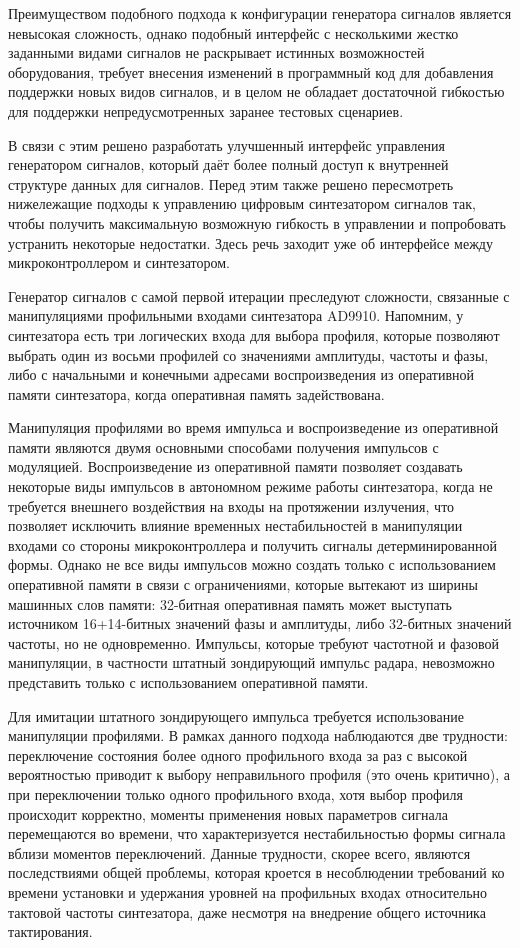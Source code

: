 \documentclass{report}
\begin{document}
Преимуществом подобного подхода к конфигурации генератора сигналов является невысокая сложность, однако подобный интерфейс с несколькими жестко заданными видами сигналов не раскрывает истинных возможностей оборудования, требует внесения изменений в программный код для добавления поддержки новых видов сигналов, и в целом не обладает достаточной гибкостью для поддержки непредусмотренных заранее тестовых сценариев.

В связи с этим решено разработать улучшенный интерфейс управления генератором сигналов, который даёт более полный доступ к внутренней структуре данных для сигналов. Перед этим также решено пересмотреть нижележащие подходы к управлению цифровым синтезатором сигналов так, чтобы получить максимальную возможную гибкость в управлении и попробовать устранить некоторые недостатки. Здесь речь заходит уже об интерфейсе между микроконтроллером и синтезатором.

Генератор сигналов с самой первой итерации преследуют сложности, связанные с манипуляциями профильными входами синтезатора AD9910. Напомним, у синтезатора есть три логических входа для выбора профиля, которые позволяют выбрать один из восьми профилей со значениями амплитуды, частоты и фазы, либо с начальными и конечными адресами воспроизведения из оперативной памяти синтезатора, когда оперативная память задействована.

Манипуляция профилями во время импульса и воспроизведение из оперативной памяти являются двумя основными способами получения импульсов с модуляцией. Воспроизведение из оперативной памяти позволяет создавать некоторые виды импульсов в автономном режиме работы синтезатора, когда не требуется внешнего воздействия на входы на протяжении излучения, что позволяет исключить влияние временных нестабильностей в манипуляции входами со стороны микроконтроллера и получить сигналы детерминированной формы. Однако не все виды импульсов можно создать только с использованием оперативной памяти в связи с ограничениями, которые вытекают из ширины машинных слов памяти: 32-битная оперативная память может выступать источником 16+14-битных значений фазы и амплитуды, либо 32-битных значений частоты, но не одновременно. Импульсы, которые требуют частотной и фазовой манипуляции, в частности штатный зондирующий импульс радара, невозможно представить только с использованием оперативной памяти.

Для имитации штатного зондирующего импульса требуется использование манипуляции профилями. В рамках данного подхода наблюдаются две трудности: переключение состояния более одного профильного входа за раз с высокой вероятностью приводит к выбору неправильного профиля (это очень критично), а при переключении только одного профильного входа, хотя выбор профиля происходит корректно, моменты применения новых параметров сигнала перемещаются во времени, что характеризуется нестабильностью формы сигнала вблизи моментов переключений. Данные трудности, скорее всего, являются последствиями общей проблемы, которая кроется в несоблюдении требований ко времени установки и удержания уровней на профильных входах относительно тактовой частоты синтезатора, даже несмотря на внедрение общего источника тактирования.
\end{document}
